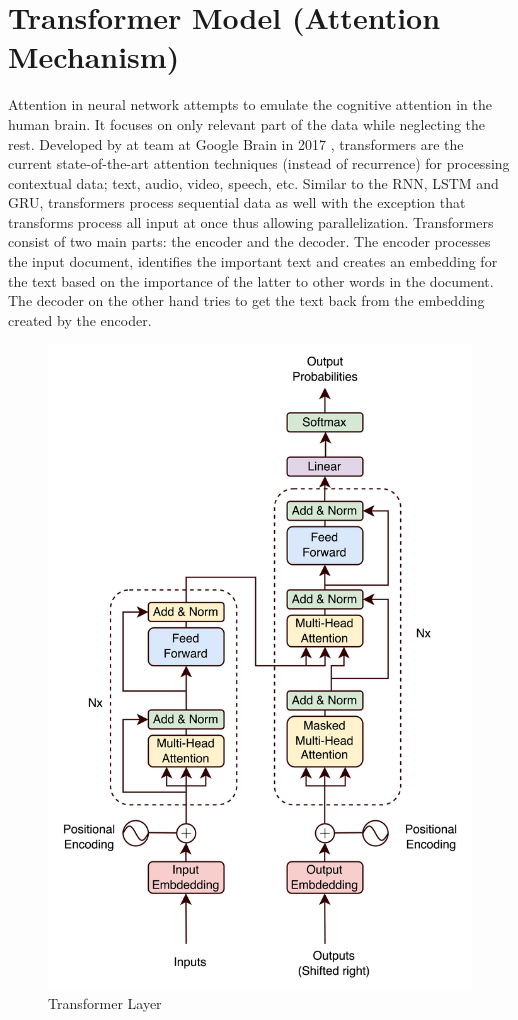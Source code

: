\section{Transformer Model (Attention Mechanism)}
\label{section: transformers}
Attention in neural network attempts to emulate the cognitive attention in the human brain. It focuses on only relevant part of the data while neglecting the rest. Developed by at team at Google Brain in 2017 \cite{Vaswani2017}, transformers are the current state-of-the-art attention techniques (instead of recurrence) for processing contextual data; text, audio, video, speech, etc. Similar to the RNN, LSTM and GRU, transformers process sequential data as well with the exception that transforms process all input at once thus allowing parallelization. Transformers consist of two main parts: the encoder and the decoder. The encoder processes the input document, identifies the important text and creates an embedding for the text based on the importance of the latter to other words in the document. The decoder on the other hand tries to get the text back from the embedding created by the encoder.
\begin{figure}[H]
    \centering
    \includegraphics[scale=1.1]{CHAPTER_4/c4_fig_transformer_layer_draw.png}
    \caption{Transformer Layer \protect\cite{Vaswani2017}}
    \label{TRANSFORMER_LAYER}
  \end{figure}
